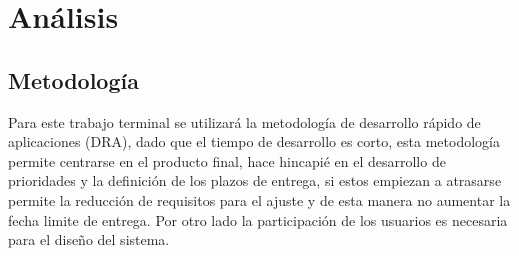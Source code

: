 \chapter{Análisis} \label{analisis}

\section{Metodología}
Para este trabajo terminal se utilizará la metodología de desarrollo rápido de aplicaciones (DRA), dado que el tiempo de desarrollo es corto, esta metodología permite centrarse en el producto final, hace hincapié en el desarrollo de prioridades y la definición de los plazos de entrega, si estos empiezan a atrasarse permite la reducción de requisitos para el ajuste y de esta manera no aumentar la fecha limite de entrega. Por otro lado la participación de los usuarios es necesaria para el diseño del sistema.\cite{dra}
